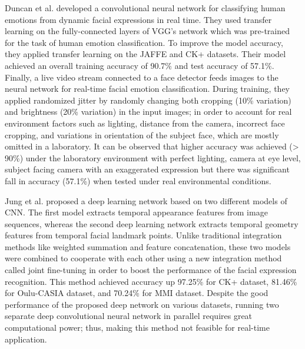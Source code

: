\documentclass[master]{thesis-uestc}
\begin{document}
Duncan et al. developed a convolutional neural network for classifying human emotions from dynamic facial expressions in real time. They used transfer learning on the fully-connected layers of VGG's network which was pre-trained for the task of human emotion classification. To improve the model accuracy, they applied transfer learning on the JAFFE and CK+ datasets. Their model achieved an overall training accuracy of 90.7\% and test accuracy of 57.1\%. Finally, a live video stream connected to a face detector feeds images to the neural network for real-time facial emotion classification. During training, they applied randomized jitter by randomly changing both cropping (10\% variation) and brightness (20\% variation) in the input images; in order to account for real environment factors such as lighting, distance from the camera, incorrect face cropping, and variations in orientation of the subject face, which are mostly omitted in a laboratory. It can be observed that higher accuracy was achieved (> 90\%) under the laboratory environment with perfect lighting, camera at eye level, subject facing camera with an exaggerated expression but there was significant fall in accuracy (57.1\%) when tested under real environmental conditions.

Jung et al. proposed a deep learning network based on two different models of CNN. The first model extracts temporal appearance features from image sequences, whereas the second deep learning network extracts temporal geometry features from temporal facial landmark points. Unlike traditional integration methods like weighted summation and feature concatenation, these two models were combined to cooperate with each other using a new integration method called joint fine-tuning in order to boost the performance of the facial expression recognition. This method achieved accuracy up 97.25\% for CK+ dataset, 81.46\% for Oulu-CASIA dataset, and 70.24\% for MMI dataset. Despite the good performance of the proposed deep network on various datasets, running two separate deep convolutional neural network in parallel requires great computational power; thus, making this method not feasible for real-time application.
\end{document}
